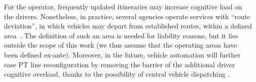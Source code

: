 \documentclass[a4paper,fleqn]{cas-sc}
\begin{document}
For the operator, frequently updated itineraries may increase cognitive load on the drivers.
Nonetheless, in practice, several agencies operate services with ``route deviation'', in which vehicles may depart from established routes, within a defined area~\citep{NationalRTAP_ADA_Toolkit_2024}.  The definition of such an area is needed for liability reasons, but it lies outside the scope of this work (we thus assume that the operating areas have been defined ex-ante). Moreover, in the future, vehicle automation will further ease PT line reconfiguration by removing the barrier of the additional driver cognitive overload, thanks to the possibility of central vehicle dispatching \citep{FagnantKockelman2015}.
\end{document}
